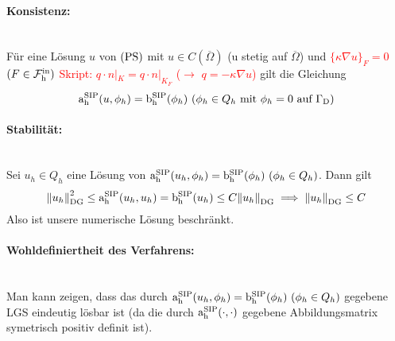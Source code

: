 \paragraph{Konsistenz:}~\\
Für eine Lösung $ u $ von $ \operatorname{(PS)} $ mit $ u \in C(\overline{\Omega}) $ (u stetig auf $ \overline{\Omega} $) und  \textcolor{red}{$ \{\kappa \nabla u\}_F =0$   $(F \in \operatorname{\mathcal{F}_h^{\text{in}}})$} \textcolor{red}{Skript: $q \cdot n|_K = q \cdot n|_{K_F} $ ($\rightarrow$ $q = - \kappa \nabla u$)}
gilt die Gleichung
\[ \operatorname{a_h^{\text{SIP}}}(u,\phi_h) = \operatorname{b_h^{\text{SIP}}}(\phi_h) \ (\phi_h \in Q_h \text{ mit } \phi_h = 0 \text{ auf } \Gamma_{\text{D}}) \]

\paragraph{Stabilität:}~\\
Sei $ u_h \in Q_h $ eine Lösung von $ \operatorname{a_h^{\text{SIP}}}(u_h, \phi_h) = \operatorname{b_h^{\text{SIP}}}(\phi_h) \ (\phi_h \in Q_h) $. Dann gilt
\[ \norm{u_h}_{\text{DG}}^2 \le \operatorname{a_h^{\text{SIP}}}(u_h, u_h) = \operatorname{b_h^{\text{SIP}}}(u_h) \le C \norm{u_h}_{\text{DG}} \implies \norm{u_h}_{\text{DG}} \le C \]
Also ist unsere numerische Lösung beschränkt. 

\paragraph{Wohldefiniertheit des Verfahrens:}~\\
Man kann zeigen, dass das durch $ \operatorname{a_h^{\text{SIP}}}(u_h, \phi_h) = \operatorname{b_h^{\text{SIP}}}(\phi_h) \ (\phi_h \in Q_h) $ gegebene LGS eindeutig lösbar ist (da die durch $ \operatorname{a_h^{\text{SIP}}}(\cdot, \cdot)  $ gegebene Abbildungsmatrix symetrisch positiv definit ist).